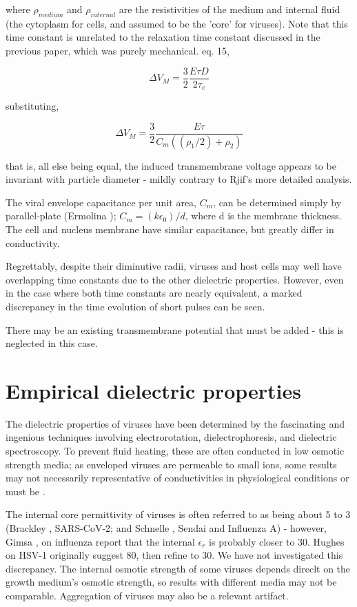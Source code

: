 \documentclass[fleqn,10pt]{paper}
\begin{document}
where $\rho_{medium}$ and $\rho_{internal}$ are the resistivities of the medium and internal fluid (the cytoplasm for cells, and assumed to be the 'core' for viruses). Note that this time constant is unrelated to the relaxation time constant discussed in the previous paper, which was purely mechanical. \cite{Bioelectric2007} eq. 15, 

$$\Delta V_M = \frac{3}{2}\frac{E\tau D}{2 \tau_c }$$

substituting,

$$\Delta V_M = \frac{3}{2}\frac{E \tau}{C_m ((\rho_1/2) + \rho_2)}$$

that is, all else being equal, the induced transmembrane voltage appears to be invariant with particle diameter - mildly contrary to Rjif's more detailed analysis.

The viral envelope capacitance per unit area, $C_m$, can be determined simply by parallel-plate (Ermolina \cite{Study2001}); $C_m = (k\epsilon_0) / d$, where d is the membrane thickness. The cell and nucleus membrane have similar capacitance, but greatly differ in conductivity. 

Regrettably, despite their diminutive radii, viruses and host cells may well have overlapping time constants due to the other dielectric properties. However, even in the case where both time constants are nearly equivalent, a marked discrepancy in the time evolution of short pulses can be seen.

There may be an existing transmembrane potential that must be added - this is neglected in this case.


\section*{Empirical dielectric properties}


The dielectric properties of viruses have been determined by the fascinating and ingenious techniques involving electrorotation, dielectrophoresis, and dielectric spectroscopy. To prevent fluid heating, these are often conducted in low osmotic strength media; as enveloped viruses are permeable to small ions, some results may not necessarily representative of conductivities in physiological conditions or must be \cite{Assessment}.

The internal core permittivity of viruses is often referred to as being about 5 to 3 (Brackley \cite{Electrostatic2020}, SARS-CoV-2; and Schnelle \cite{Trapping1996}, Sendai and Influenza A) - however, Gimsa \cite{New1999}, on influenza report that the internal $\epsilon_r$ is probably closer to 30. Hughes on HSV-1 originally suggest 80\cite{Manipulation1998}, then refine to 30\cite{Dielectrophoretic2001}. We have not investigated this discrepancy. The internal osmotic strength of some viruses depends direclt on the growth medium's osmotic strength\cite{Osmotic2003}, so results with different media may not be comparable. Aggregation of viruses may also be a relevant artifact. 
\end{document}

